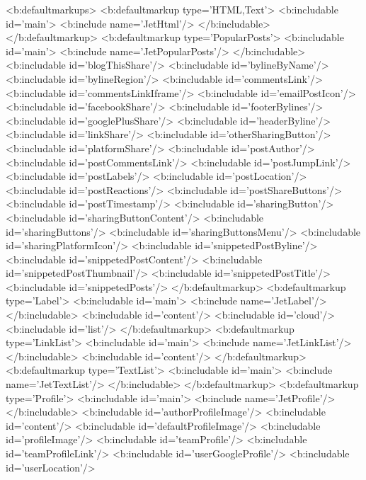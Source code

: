 {{{{  
  
  
<b:defaultmarkups>
  <b:defaultmarkup type='HTML,Text'>
    <b:includable id='main'>
      <b:include name='JetHtml'/>
    </b:includable>
  </b:defaultmarkup>
  <b:defaultmarkup type='PopularPosts'>
    <b:includable id='main'>
      <b:include name='JetPopularPosts'/>
    </b:includable>
    <b:includable id='blogThisShare'/>
    <b:includable id='bylineByName'/>
    <b:includable id='bylineRegion'/>
    <b:includable id='commentsLink'/>
    <b:includable id='commentsLinkIframe'/>
    <b:includable id='emailPostIcon'/>
    <b:includable id='facebookShare'/>
    <b:includable id='footerBylines'/>
    <b:includable id='googlePlusShare'/>
    <b:includable id='headerByline'/>
    <b:includable id='linkShare'/>
    <b:includable id='otherSharingButton'/>
    <b:includable id='platformShare'/>
    <b:includable id='postAuthor'/>
    <b:includable id='postCommentsLink'/>
    <b:includable id='postJumpLink'/>
    <b:includable id='postLabels'/>
    <b:includable id='postLocation'/>
    <b:includable id='postReactions'/>
    <b:includable id='postShareButtons'/>
    <b:includable id='postTimestamp'/>
    <b:includable id='sharingButton'/>
    <b:includable id='sharingButtonContent'/>
    <b:includable id='sharingButtons'/>
    <b:includable id='sharingButtonsMenu'/>
    <b:includable id='sharingPlatformIcon'/>
    <b:includable id='snippetedPostByline'/>
    <b:includable id='snippetedPostContent'/>
    <b:includable id='snippetedPostThumbnail'/>
    <b:includable id='snippetedPostTitle'/>
    <b:includable id='snippetedPosts'/>
  </b:defaultmarkup>
  <b:defaultmarkup type='Label'>
    <b:includable id='main'>
      <b:include name='JetLabel'/>
    </b:includable>
    <b:includable id='content'/>
    <b:includable id='cloud'/>
    <b:includable id='list'/>
  </b:defaultmarkup>
  <b:defaultmarkup type='LinkList'>
    <b:includable id='main'>
      <b:include name='JetLinkList'/>
    </b:includable>
    <b:includable id='content'/>
  </b:defaultmarkup>
  <b:defaultmarkup type='TextList'>
    <b:includable id='main'>
      <b:include name='JetTextList'/>
    </b:includable>
  </b:defaultmarkup>
  <b:defaultmarkup type='Profile'>
    <b:includable id='main'>
      <b:include name='JetProfile'/>
    </b:includable>
    <b:includable id='authorProfileImage'/>
    <b:includable id='content'/>
    <b:includable id='defaultProfileImage'/>
    <b:includable id='profileImage'/>
    <b:includable id='teamProfile'/>
    <b:includable id='teamProfileLink'/>
    <b:includable id='userGoogleProfile'/>
    <b:includable id='userLocation'/>
}}}}
